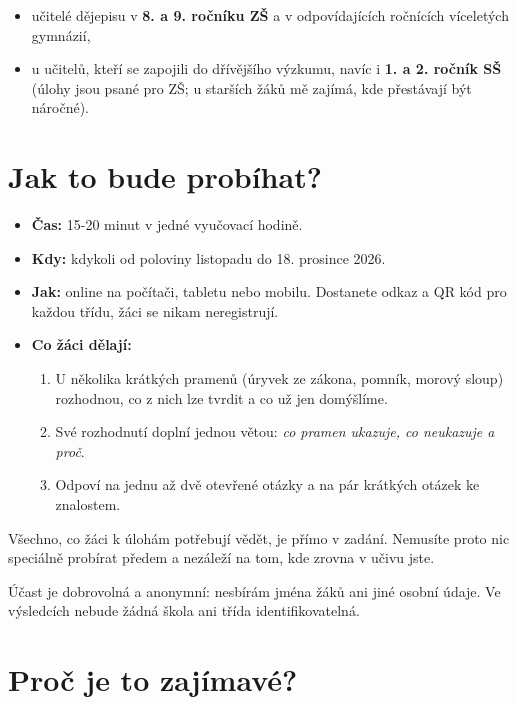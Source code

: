 \documentclass[
  12pt,
  english,
  a4paper,
  extrafontsizes,onecolumn,openright
  ]{memoir}
\providecommand{\tightlist}{%
  \setlength{\itemsep}{0pt}\setlength{\parskip}{0pt}}
\begin{document}
\begin{itemize}
\tightlist
\item
  učitelé dějepisu v \textbf{8. a 9. ročníku ZŠ} a v odpovídajících
  ročnících víceletých gymnázií,
\item
  u učitelů, kteří se zapojili do dřívějšího výzkumu, navíc i
  \textbf{1. a 2. ročník SŠ} (úlohy jsou psané pro ZŠ; u starších žáků mě
  zajímá, kde přestávají být náročné).
\end{itemize}

\section{Jak to bude probíhat?}\label{jak-to-bude-probuxedhat}

\begin{itemize}
\tightlist
\item
  \textbf{Čas:} 15-20 minut v jedné vyučovací hodině.
\item
  \textbf{Kdy:} kdykoli od poloviny listopadu do 18. prosince 2026.
\item
  \textbf{Jak:} online na počítači, tabletu nebo mobilu. Dostanete odkaz a
  QR kód pro každou třídu, žáci se nikam neregistrují.
\item
  \textbf{Co žáci dělají:}

  \begin{enumerate}
  \def\labelenumi{\arabic{enumi}.}
  \tightlist
  \item
    U několika krátkých pramenů (úryvek ze zákona, pomník, morový
    sloup) rozhodnou, co z nich lze tvrdit a co už jen domýšlíme.
  \item
    Své rozhodnutí doplní jednou větou: \emph{co pramen ukazuje, co
    neukazuje a proč}.
  \item
    Odpoví na jednu až dvě otevřené otázky a na pár krátkých
    otázek ke znalostem.
  \end{enumerate}
\end{itemize}

Všechno, co žáci k úlohám potřebují vědět, je přímo v zadání. Nemusíte
proto nic speciálně probírat předem a nezáleží na tom, kde zrovna v
učivu jste.

Účast je dobrovolná a anonymní: nesbírám jména žáků ani jiné osobní
údaje. Ve výsledcích nebude žádná škola ani třída identifikovatelná.

\section{Proč je to zajímavé?}\label{proux10d-je-to-zajuxedmavuxe9}
\end{document}
